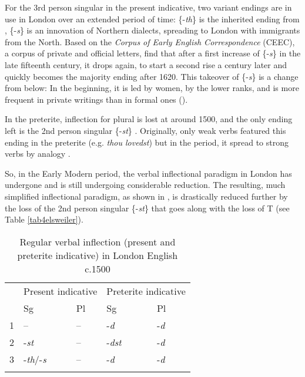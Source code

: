 \documentclass[output=paper,hidelinks]{langscibook}
\begin{document}
For the 3rd person singular in the present indicative, two variant endings are in use in London  over an extended period of time: \{-\textit{th}\} is the inherited ending from , \{-\textit{s}\} is an innovation of Northern dialects, spreading to London with immigrants from the North. Based on the \textit{Corpus of Early English Correspondence} (CEEC), a corpus of private and official letters, \citet[68]{Nevalainen2017} find that after a first increase of \{-\textit{s}\} in the late fifteenth century, it drops again, to start a second rise a century later and quickly becomes the majority ending after 1620. This takeover of \{-\textit{s}\} is a change from below: In the beginning, it is led by women, by the lower ranks, and is more frequent in private writings than in formal ones (\citeyear[123, 144]{Nevalainen2017}).

In the preterite, inflection for plural is lost at around 1500, and the only ending left is the 2nd person singular \{-\textit{st}\} \citep[165]{Lass1999}. Originally, only weak verbs featured this ending in the preterite (e.g. \textit{thou lovedst}) but in the  period, it spread to strong verbs by analogy \citep[138, e.g. \textit{thou tookst} instead of earlier \textit{thou took}]{Lass1992}.

So, in the Early Modern period, the verbal inflectional paradigm in London  has undergone and is still undergoing considerable reduction. The resulting, much simplified inflectional paradigm, as shown in , is drastically reduced further by the loss of the 2nd person singular \{-\textit{st}\} that goes along with the loss of T (see Table \ref{tab4elsweiler}).\largerpage[1.5]

\begin{table}
\caption{Regular verbal inflection (present and preterite indicative) in London English c.1500 \citep[161]{Lass1999}}
\label{tab3elsweiler}
\begin{tabularx}{.8\textwidth}{X p{1cm}p{1cm}p{1cm}p{1cm}}
  \lsptoprule
            & \multicolumn{2}{l}{Present indicative} & \multicolumn{2}{l}{Preterite indicative}\\\cmidrule(lr){2-3}\cmidrule(lr){4-5}
  	 &   Sg  & Pl	&  Sg	& Pl	\\
  \midrule
  1  &   --  & --   &  -\textit{d}   & -\textit{d}	\\
  2  &  -\textit{st}  & --   &  -\textit{dst}   & -\textit{d}	\\
  3  &  -\textit{th}/-\textit{s}  & --   &  -\textit{d}   & -\textit{d}	\\
  \lspbottomrule
 \end{tabularx}
\end{table}
\end{document}

